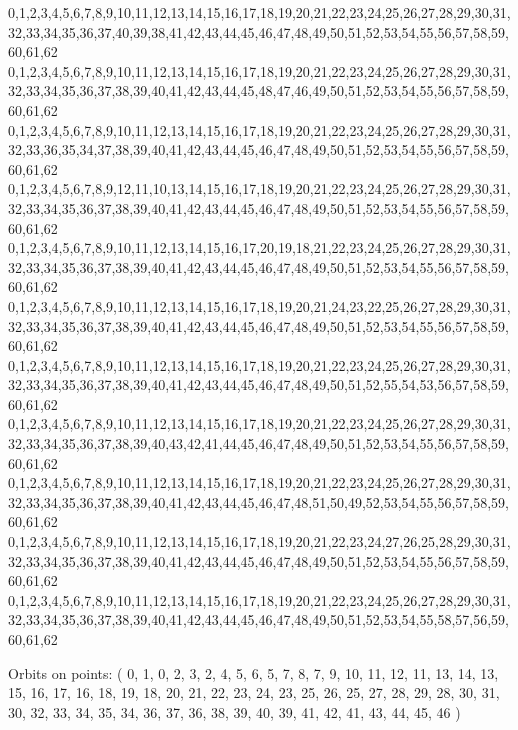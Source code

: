 \documentclass[12pt]{article}
\begin{document}
{0,1,2,3,4,5,6,7,8,9,10,11,12,13,14,15,16,17,18,19,20,21,22,23,24,25,26,27,28,29,30,31,32,33,34,35,36,37,40,39,38,41,42,43,44,45,46,47,48,49,50,51,52,53,54,55,56,57,58,59,60,61,62\\
0,1,2,3,4,5,6,7,8,9,10,11,12,13,14,15,16,17,18,19,20,21,22,23,24,25,26,27,28,29,30,31,32,33,34,35,36,37,38,39,40,41,42,43,44,45,48,47,46,49,50,51,52,53,54,55,56,57,58,59,60,61,62\\
0,1,2,3,4,5,6,7,8,9,10,11,12,13,14,15,16,17,18,19,20,21,22,23,24,25,26,27,28,29,30,31,32,33,36,35,34,37,38,39,40,41,42,43,44,45,46,47,48,49,50,51,52,53,54,55,56,57,58,59,60,61,62\\
0,1,2,3,4,5,6,7,8,9,12,11,10,13,14,15,16,17,18,19,20,21,22,23,24,25,26,27,28,29,30,31,32,33,34,35,36,37,38,39,40,41,42,43,44,45,46,47,48,49,50,51,52,53,54,55,56,57,58,59,60,61,62\\
0,1,2,3,4,5,6,7,8,9,10,11,12,13,14,15,16,17,20,19,18,21,22,23,24,25,26,27,28,29,30,31,32,33,34,35,36,37,38,39,40,41,42,43,44,45,46,47,48,49,50,51,52,53,54,55,56,57,58,59,60,61,62\\
0,1,2,3,4,5,6,7,8,9,10,11,12,13,14,15,16,17,18,19,20,21,24,23,22,25,26,27,28,29,30,31,32,33,34,35,36,37,38,39,40,41,42,43,44,45,46,47,48,49,50,51,52,53,54,55,56,57,58,59,60,61,62\\
0,1,2,3,4,5,6,7,8,9,10,11,12,13,14,15,16,17,18,19,20,21,22,23,24,25,26,27,28,29,30,31,32,33,34,35,36,37,38,39,40,41,42,43,44,45,46,47,48,49,50,51,52,55,54,53,56,57,58,59,60,61,62\\
0,1,2,3,4,5,6,7,8,9,10,11,12,13,14,15,16,17,18,19,20,21,22,23,24,25,26,27,28,29,30,31,32,33,34,35,36,37,38,39,40,43,42,41,44,45,46,47,48,49,50,51,52,53,54,55,56,57,58,59,60,61,62\\
0,1,2,3,4,5,6,7,8,9,10,11,12,13,14,15,16,17,18,19,20,21,22,23,24,25,26,27,28,29,30,31,32,33,34,35,36,37,38,39,40,41,42,43,44,45,46,47,48,51,50,49,52,53,54,55,56,57,58,59,60,61,62\\
0,1,2,3,4,5,6,7,8,9,10,11,12,13,14,15,16,17,18,19,20,21,22,23,24,27,26,25,28,29,30,31,32,33,34,35,36,37,38,39,40,41,42,43,44,45,46,47,48,49,50,51,52,53,54,55,56,57,58,59,60,61,62\\
0,1,2,3,4,5,6,7,8,9,10,11,12,13,14,15,16,17,18,19,20,21,22,23,24,25,26,27,28,29,30,31,32,33,34,35,36,37,38,39,40,41,42,43,44,45,46,47,48,49,50,51,52,53,54,55,58,57,56,59,60,61,62\\

\bigskip

Orbits on points: ( 0, 1, 0, 2, 3, 2, 4, 5, 6, 5, 7, 8, 7, 9, 10, 11, 12, 11, 13, 14, 13, 15, 16, 17, 16, 18, 19, 18, 20, 21, 22, 23, 24, 23, 25, 26, 25, 27, 28, 29, 28, 30, 31, 30, 32, 33, 34, 35, 34, 36, 37, 36, 38, 39, 40, 39, 41, 42, 41, 43, 44, 45, 46 )\\


}
\end{document}
